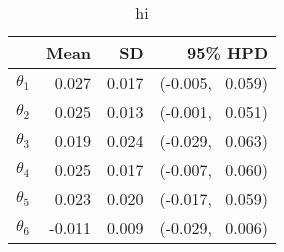 \begin{table}[ht]
\centering
\begin{tabular}{rrrr}
  \hline
 & Mean & SD & 95\% HPD \\ 
  \hline
  $\theta_1$ & 0.027 & 0.017 & (-0.005,~ 0.059) \\ 
  $\theta_2$ & 0.025 & 0.013 & (-0.001,~ 0.051) \\ 
  $\theta_3$ & 0.019 & 0.024 & (-0.029,~ 0.063) \\ 
  $\theta_4$ & 0.025 & 0.017 & (-0.007,~ 0.060) \\ 
  $\theta_5$ & 0.023 & 0.020 & (-0.017,~ 0.059) \\ 
  $\theta_6$ &-0.011 & 0.009 & (-0.029,~ 0.006) \\ 
   \hline
\end{tabular}
\caption{hi}
\label{tab:thPost}
\end{table}
